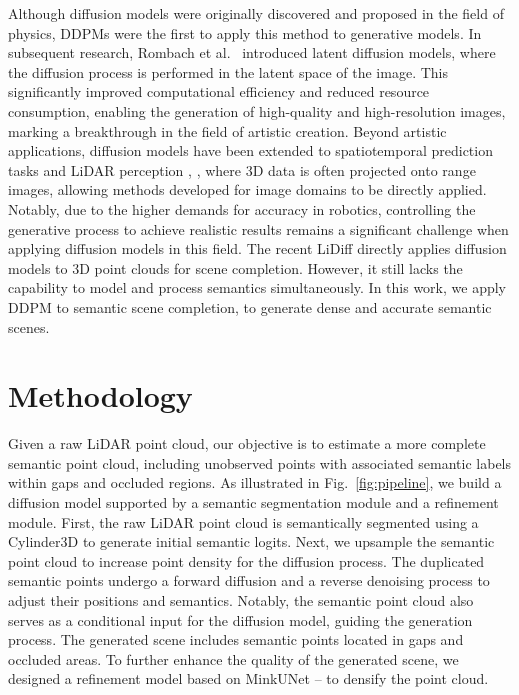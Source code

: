 \documentclass[conference]{IEEEtran}
\begin{document}
Although diffusion models were originally discovered and proposed in the field of physics, DDPMs \cite{xyan} were the first to apply this method to generative models.
In subsequent research, Rombach et al.\ \cite{lroldao2020} introduced latent diffusion models, where the diffusion process is performed in the latent space of the image.
This significantly improved computational efficiency and reduced resource consumption, enabling the generation of high-quality and high-resolution images, marking a breakthrough in the field of artistic creation.
Beyond artistic applications, diffusion models have been extended to spatiotemporal prediction tasks \cite{aqa} and LiDAR perception \cite{pli2022}, \cite{hcaoands2023}, where 3D data is often projected onto range images, allowing methods developed for image domains to be directly applied.
Notably, due to the higher demands for accuracy in robotics, controlling the generative process to achieve realistic results remains a significant challenge when applying diffusion models in this field.
The recent LiDiff \cite{zxia2024} directly applies diffusion models to 3D point clouds for scene completion.
However, it still lacks the capability to model and process semantics simultaneously.
In this work, we apply DDPM to semantic scene completion, to generate dense and accurate semantic scenes.

\section{Methodology}

Given a raw LiDAR point cloud, our objective is to estimate a more complete semantic point cloud, including unobserved points with associated semantic labels within gaps and occluded regions.
As illustrated in Fig.~\ref{fig:pipeline}, we build a diffusion model supported by a semantic segmentation module and a refinement module.
First, the raw LiDAR point cloud is semantically segmented using a Cylinder3D \cite{hcao} to generate initial semantic logits.
Next, we upsample the semantic point cloud to increase point density for the diffusion process.
The duplicated semantic points undergo a forward diffusion and a reverse denoising process to adjust their positions and semantics.
Notably, the semantic point cloud also serves as a conditional input for the diffusion model, guiding the generation process.
The generated scene includes semantic points located in gaps and occluded areas.
To further enhance the quality of the generated scene, we designed a refinement model based on MinkUNet \cite{hjang2025}--\cite{hcaoands2024} to densify the point cloud.
\end{document}
